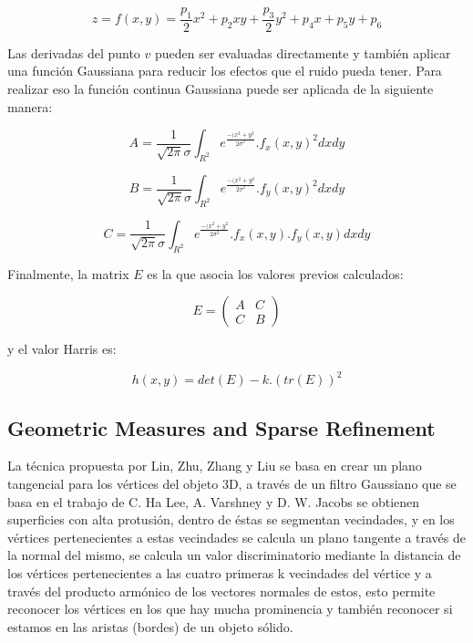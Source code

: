\documentclass[conference]{IEEEtran}
\begin{document}
\begin{equation}
z = f(x,y) = \frac{p_{1}}{2} x^{2} + p_{2}xy + \frac{p_{3}}{2} y^{2} + p_{4}x + p_{5}y + p_{6}
\end{equation}

Las derivadas del punto $v$ pueden ser evaluadas directamente y también aplicar una función Gaussiana para reducir los efectos que el ruido pueda tener. Para realizar eso la función continua Gaussiana puede ser aplicada de la siguiente manera:

\begin{equation}
A = \frac{1}{\sqrt{2\pi}\sigma}\int_{R^{2}} e^{\frac{-(x^{2}+y^{2}}{2\sigma^{2}}}.f_{x}(x,y)^2 dx dy
\end{equation}

\begin{equation}
B = \frac{1}{\sqrt{2\pi}\sigma}\int_{R^{2}} e^{\frac{-(x^{2}+y^{2}}{2\sigma^{2}}}.f_{y}(x,y)^2 dx dy
\end{equation}

\begin{equation}
C = \frac{1}{\sqrt{2\pi}\sigma}\int_{R^{2}} e^{\frac{-(x^{2}+y^{2}}{2\sigma^{2}}}.f_{x}(x,y).f_{y}(x,y) dx dy
\end{equation}

Finalmente, la matrix $E$ es la que asocia los valores previos calculados:

\[ E = \left( \begin{array}{cc}
A & C \\
C & B \end{array} \right)\]

y el valor Harris es:

\begin{equation}
h(x,y)=det(E)-k.(tr(E))^{2}
\end{equation}

\subsection{Geometric Measures and Sparse Refinement}
La técnica propuesta por Lin, Zhu, Zhang y Liu se basa en crear un plano tangencial para los vértices del objeto 3D, a través de un filtro Gaussiano que se basa en el trabajo de C. Ha Lee, A. Varshney y D. W. Jacobs \cite{mesh saliency} se obtienen superficies con alta protusión, dentro de éstas se segmentan vecindades, y en los vértices pertenecientes a estas vecindades se calcula un plano tangente a través de la normal del mismo, se calcula un valor discriminatorio mediante la distancia de los vértices pertenecientes a las cuatro primeras k vecindades del vértice y a través del producto armónico de los vectores normales de estos, esto permite reconocer los vértices en los que hay mucha prominencia y también reconocer si estamos en las aristas (bordes) de un objeto sólido.
\end{document}
